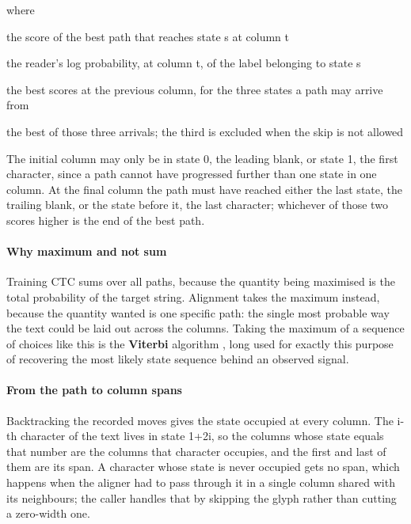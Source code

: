 \noindent where
\begin{description}[leftmargin=2.4em,style=nextline,font=\normalfont\ttfamily]\setlength\itemsep{1pt}
  \item[{$\alpha[t,s]$}] \normalfont the score of the best path that reaches state s at column t
  \item[{$\log p_t(\mathrm{ext}[s])$}] \normalfont the reader's log probability, at column t, of the label belonging to state s
  \item[{$\alpha[t-1,\,\cdot\,]$}] \normalfont the best scores at the previous column, for the three states a path may arrive from
  \item[{$\max$}] \normalfont the best of those three arrivals; the third is excluded when the skip is not allowed
\end{description}
The initial column may only be in state 0, the leading blank, or state 1, the first character, since a path cannot have progressed further than one state in one column. At the final column the path must have reached either the last state, the trailing blank, or the state before it, the last character; whichever of those two scores higher is the end of the best path.


\paragraph{Why maximum and not sum}
Training CTC sums over all paths, because the quantity being maximised is the total probability of the target string. Alignment takes the maximum instead, because the quantity wanted is one specific path: the single most probable way the text could be laid out across the columns. Taking the maximum of a sequence of choices like this is the \textbf{Viterbi} algorithm \cite{viterbi1967}, long used for exactly this purpose of recovering the most likely state sequence behind an observed signal.


\paragraph{From the path to column spans}
Backtracking the recorded moves gives the state occupied at every column. The i-th character of the text lives in state 1+2i, so the columns whose state equals that number are the columns that character occupies, and the first and last of them are its span. A character whose state is never occupied gets no span, which happens when the aligner had to pass through it in a single column shared with its neighbours; the caller handles that by skipping the glyph rather than cutting a zero-width one.


